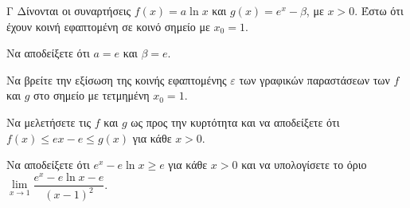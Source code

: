 \begin{thema}{Γ}
Δίνονται οι συναρτήσεις $f(x) = a \ln x$ και $g(x) = e^x - \beta$, με $x > 0$. Έστω ότι έχουν κοινή εφαπτομένη σε κοινό σημείο με $x_0 = 1$.
\begin{erwthma}
  \item Να αποδείξετε ότι $a = e$ και $\beta = e$.
  \item Να βρείτε την εξίσωση της κοινής εφαπτομένης $\varepsilon$ των γραφικών παραστάσεων των $f$ και $g$ στο σημείο με τετμημένη $x_0 = 1$.
  \item Να μελετήσετε τις $f$ και $g$ ως προς την κυρτότητα και να αποδείξετε ότι $f(x) \le e x - e \le g(x)$ για κάθε $x > 0$.
  \item Να αποδείξετε ότι $e^x - e \ln x \ge e$ για κάθε $x > 0$ και να υπολογίσετε το όριο $\lim\limits_{x \to 1} \dfrac{e^x - e\ln x - e}{(x-1)^2}$.
\end{erwthma}
\end{thema}
